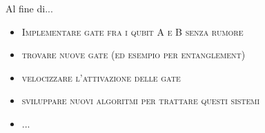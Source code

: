 \documentclass[xcolor=x11names,compress]{beamer}
\renewcommand{\(}{\begin{columns}}
\renewcommand{\)}{\end{columns}}
\newcommand{\<}[1]{\begin{column}{#1}}
\renewcommand{\>}{\end{column}}
\begin{document}
\begin{frame}{Al fine di...}
\begin{itemize}
  \item \textsc{Implementare gate fra i qubit A e B senza rumore} 
  \item \textsc{trovare nuove gate (ed esempio per entanglement)}
  \item \textsc{velocizzare l'attivazione delle gate}
  \item \textsc{sviluppare nuovi algoritmi per trattare questi sistemi}  
  \item \textsc{...}
\end{itemize}
 

\end{frame}

\end{document}
